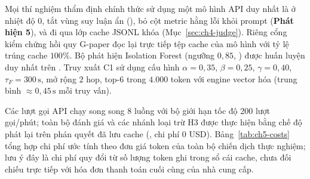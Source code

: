 Mọi thí nghiệm thẩm định chính thức sử dụng một mô hình API duy nhất là  ở nhiệt độ $0$, tắt vùng suy luận ẩn (), bỏ cột metric hằng lỗi  khỏi prompt (\textbf{Phát hiện 5}), và đi qua lớp cache JSONL khóa  (Mục~\ref{sec:ch4-judge}). Riêng cổng kiểm chứng hồi quy G-paper đọc lại trực tiếp tệp cache của mô hình  với tỷ lệ trúng cache $100\%$. Bộ phát hiện Isolation Forest (ngưỡng $0{,}85$, ) được huấn luyện duy nhất trên . Truy xuất C1 sử dụng cấu hình $\alpha = 0{,}35$, $\beta = 0{,}25$, $\gamma = 0{,}40$, $\tau_F = 300\,\text{s}$, mở rộng $2$ hop, top-$6$ trong $4.000$ token với engine vector hóa (trung bình $\approx 0{,}45\,\text{s}$ mỗi truy vấn).

Các lượt gọi API chạy song song 8 luồng với bộ giới hạn tốc độ 200 lượt gọi/phút; toàn bộ đánh giá \CTAV{} và các nhánh loại trừ H3 được thực hiện bằng chế độ phát lại trên phán quyết đã lưu cache (, chi phí $0$ USD). Bảng~\ref{tab:ch5-costs} tổng hợp chi phí ước tính theo đơn giá token của toàn bộ chiến dịch thực nghiệm; lưu ý đây là chi phí quy đổi từ số lượng token ghi trong sổ cái cache, chưa đối chiếu trực tiếp với hóa đơn thanh toán cuối cùng của nhà cung cấp.

